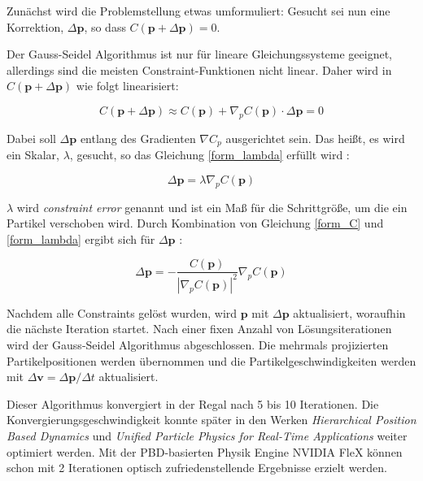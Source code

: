 Zunächst wird die Problemstellung etwas umformuliert: Gesucht sei nun eine Korrektion, $\Delta \textbf{p}$, so dass $C(\textbf{p}+\Delta \textbf{p})=0$. 

Der Gauss-Seidel Algorithmus ist nur für lineare Gleichungssysteme geeignet, allerdings sind die meisten Constraint-Funktionen nicht linear. Daher wird in \newline \cite{PBD} $C(\textbf{p}+\Delta \textbf{p})$ wie folgt linearisiert:

\begin{equation}
C(\textbf{p}+\Delta \textbf{p}) \approx C(\textbf{p}) + \nabla_p C(\textbf{p}) \cdot \Delta \textbf{p} = 0
\label{form_C}
\end{equation}

Dabei soll $\Delta \textbf{p}$ entlang des Gradienten $\nabla C_p$ ausgerichtet sein. Das heißt, es wird ein Skalar, $\lambda$, gesucht, so das Gleichung \ref{form_lambda} erfüllt wird \cite{PBD}:

\begin{equation}
\Delta \textbf{p} = \lambda \nabla_p C(\textbf{p})
\label{form_lambda}
\end{equation}

$\lambda$ wird \textit{constraint error} genannt und ist ein Maß für die Schrittgröße, um die ein Partikel verschoben wird. Durch Kombination von Gleichung \ref{form_C} und \ref{form_lambda} ergibt sich für $\Delta \textbf{p}$ \cite{PBD}:

\begin{equation}
\Delta \textbf{p} = - \frac{C(\textbf{p})}{|\nabla_p C(\textbf{p})|^2} \nabla_p C(\textbf{p}) 
\label{form_db}
\end{equation}

Nachdem alle Constraints gelöst wurden, wird $\textbf{p}$ mit $\Delta \textbf{p}$ aktualisiert, woraufhin die nächste Iteration startet. Nach einer fixen Anzahl von Lösungsiterationen wird der Gauss-Seidel Algorithmus abgeschlossen. Die mehrmals projizierten Partikelpositionen werden übernommen und die Partikelgeschwindigkeiten werden mit $\Delta \textbf{v} = \Delta \textbf{p} / \Delta t$ aktualisiert.

Dieser Algorithmus konvergiert in der Regal nach 5 bis 10 Iterationen. Die Konvergierungsgeschwindigkeit konnte später in den Werken \textit{Hierarchical Position Based Dynamics} \cite{Mller2008HierarchicalPB} und \textit{Unified Particle Physics for Real-Time Applications} \cite{UPP} weiter optimiert werden. Mit der PBD-basierten Physik Engine NVIDIA FleX können schon mit 2 Iterationen optisch zufriedenstellende Ergebnisse erzielt werden.

